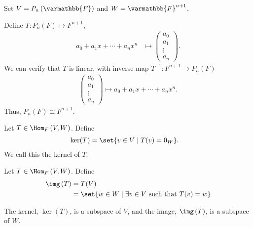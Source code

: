 \documentclass[10pt]{mypackage}
\renewcommand*{\mathbb}[1]{\varmathbb{#1}}
\begin{document}
\begin{example}[$P_{n}\left(\mathbb{F}\right)$ and $F^{n+1}$]
  Set $V = P_{n}\left(\mathbb{F}\right)$ and $W = \mathbb{F}^{n+1}$.\newline

  Define $T: P_{n}\left(F\right) \mapsto F^{n+1}$,
  \begin{align*}
    a_0 + a_1x + \cdots + a_nx^n &\mapsto \begin{pmatrix}a_0\\a_1\\\vdots\\a_n\end{pmatrix}.
  \end{align*}
  We can verify that $T$ is linear, with inverse map $T^{-1}: F^{n+1}\rightarrow P_{n}\left(F\right)$
  \begin{align*}
    \begin{pmatrix}a_0\\a_1\\\vdots\\a_n\end{pmatrix} \mapsto a_0 + a_1x + \cdots + a_nx^n.
  \end{align*}
  Thus, $P_n(F) \cong F^{n+1}$.
\end{example}
\begin{definition}[Kernel]
  Let $T\in \Hom_{F}\left(V,W\right)$. Define
  \begin{align*}
    \ker (T) &= \set{v\in V\mid T(v) = 0_W}.
  \end{align*}
  We call this the kernel of $T$.
\end{definition}
\begin{definition}[Image]
  Let $T\in \Hom_{F}\left(V,W\right)$. Define
  \begin{align*}
    \img\left(T\right) &= T(V)\\
                      &= \set{w\in W\mid \exists v\in V\text{ such that }T(v) = w}
  \end{align*}
\end{definition}
\begin{lemma}
  The kernel, $\ker(T)$, is a subspace of $V$, and the image, $\img\left(T\right)$, is a subspace of $W$.
\end{lemma}
\end{document}
